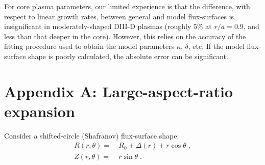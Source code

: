 For core plasma parameters, our limited experience is 
that the difference, with respect to linear growth rates, 
between general and model flux-surfaces is insignificant 
in moderately-shaped DIII-D plasmas (roughly $5\%$ at 
$r/a = 0.9$, and less than that deeper in the core).  
However, this relies on the accuracy of the fitting procedure 
used to obtain the model parameters $\kappa$, $\delta$, etc.  
If the model flux-surface shape is poorly calculated, the 
absolute error can be significant.

\clearpage
\section*{Appendix A:  Large-aspect-ratio expansion}

Consider a shifted-circle (Shafranov) flux-surface shape:
%
\begin{align}
R(r,\theta) = &~R_0+\Delta(r)+r \cos\theta \; , \\
Z(r,\theta) = &~r \sin\theta \; . 
\end{align}

